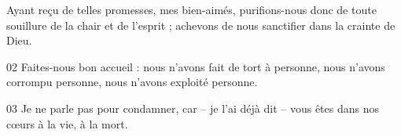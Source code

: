 Ayant reçu de telles promesses, mes bien-aimés, purifions-nous donc de toute souillure de la chair et de l’esprit ; achevons de nous sanctifier dans la crainte de Dieu.

02 Faites-nous bon accueil : nous n’avons fait de tort à personne, nous n’avons corrompu personne, nous n’avons exploité personne.

03 Je ne parle pas pour condamner, car – je l’ai déjà dit – vous êtes dans nos cœurs à la vie, à la mort.
